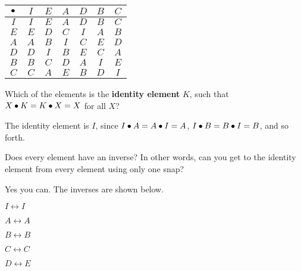 \documentclass[../gatm_answers.tex]{subfiles}
\begin{document}
\begin{center}
	\begin{tabular}{c|cccccc}
		\hline
		$\bullet$ & $I$ & $E$ & $A$ & $D$ & $B$ & $C$ \\ \hline
		\rowcolor{light-gray}
		$I$ & $I$ & $E$ & $A$ & $D$ & $B$ & $C$ \\
		$E$ & $E$ & $D$ & $C$ & $I$ & $A$ & $B$ \\
		\rowcolor{light-gray}
		$A$ & $A$ & $B$ & $I$ & $C$ & $E$ & $D$ \\
		$D$ & $D$ & $I$ & $B$ & $E$ & $C$ & $A$ \\
		\rowcolor{light-gray}
		$B$ & $B$ & $C$ & $D$ & $A$ & $I$ & $E$ \\
		$C$ & $C$ & $A$ & $E$ & $B$ & $D$ & $I$ \\ \hline
	\end{tabular}
\end{center}

\begin{outer_problem}
	\item Which of the elements is the \textbf{identity element} $K$, such that $X\bullet K = K\bullet X = X$ for all $X$? \label{prob:group_definition_start}
\end{outer_problem}

\noindent The identity element is $I$, since $I\bullet A = A\bullet I = A$, $I\bullet B = B\bullet I = B$, and so forth.

\begin{outer_problem}
	\item Does every element have an inverse? In other words, can you get to the identity element from every element using only one snap?
\end{outer_problem}

\noindent Yes you can. The inverses are shown below.
\begin{center}
	\begin{minipage}{0.18\textwidth}
		\centering
		$I\leftrightarrow I$
	\end{minipage}\hfill
	\begin{minipage}{0.18\textwidth}
		\centering
		$A\leftrightarrow A$
	\end{minipage}\hfill
	\begin{minipage}{0.18\textwidth}
		\centering
		$B\leftrightarrow B$
	\end{minipage}\hfill
	\begin{minipage}{0.18\textwidth}
		\centering
		$C\leftrightarrow C$
	\end{minipage}\hfill
	\begin{minipage}{0.18\textwidth}
		\centering
		$D\leftrightarrow E$
	\end{minipage}
\end{center}
\end{document}
